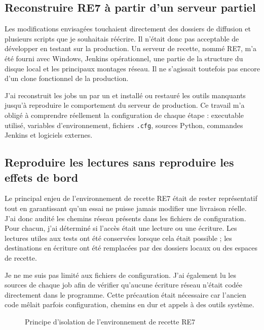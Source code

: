 \subsection{Reconstruire RE7 à partir d'un serveur partiel}

Les modifications envisagées touchaient directement des dossiers de diffusion et plusieurs scripts que je souhaitais réécrire. Il n'était donc pas acceptable de développer en testant sur la production. Un serveur de recette, nommé RE7, m'a été fourni avec Windows, Jenkins opérationnel, une partie de la structure du disque local et les principaux montages réseau. Il ne s'agissait toutefois pas encore d'un clone fonctionnel de la production.

J'ai reconstruit les jobs un par un et installé ou restauré les outils manquants jusqu'à reproduire le comportement du serveur de production. Ce travail m'a obligé à comprendre réellement la configuration de chaque étape : executable utilisé, variables d'environnement, fichiers \texttt{.cfg}, sources Python, commandes Jenkins et logiciels externes.

\subsection{Reproduire les lectures sans reproduire les effets de bord}

Le principal enjeu de l'environnement de recette RE7 était de rester représentatif tout en garantissant qu'un essai ne puisse jamais modifier une livraison réelle. J'ai donc audité les chemins réseau présents dans les fichiers de configuration. Pour chacun, j'ai déterminé si l'accès était une lecture ou une écriture. Les lectures utiles aux tests ont été conservées lorsque cela était possible ; les destinations en écriture ont été remplacées par des dossiers locaux ou des espaces de recette.

Je ne me suis pas limité aux fichiers de configuration. J'ai également lu les sources de chaque job afin de vérifier qu'aucune écriture réseau n'était codée directement dans le programme. Cette précaution était nécessaire car l'ancien code mêlait parfois configuration, chemins en dur et appels à des outils système.

\begin{figure}[H]
\centering
{}
\caption{Principe d'isolation de l'environnement de recette RE7}
\label{fig:isolation-re7}
\end{figure}

